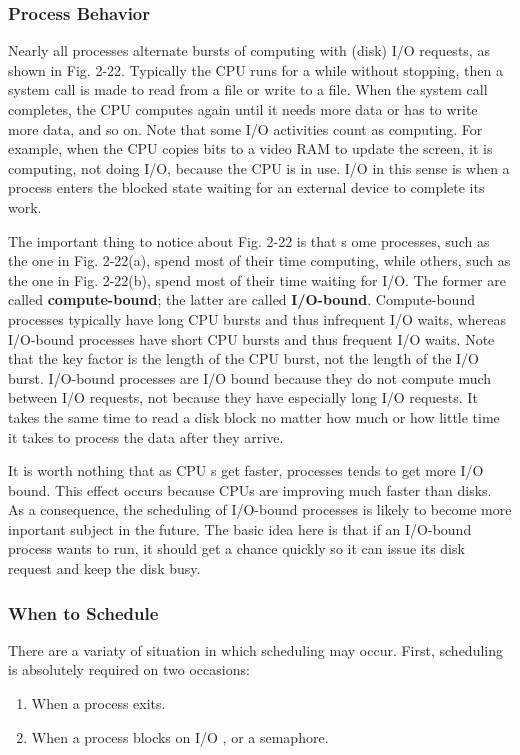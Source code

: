 \documentclass{book}
\newcommand {\kw}  [1] {\textbf{#1}}
\begin{document}
\subsubsection*{Process Behavior}
Nearly all processes alternate bursts of computing with (disk) I/O requests, as shown in Fig. 2-22.
Typically the CPU runs for a while without stopping, then a system call is made to read from a file or write to a file.
When the system call completes, the CPU computes again until it needs more data or has to write more data, and so on.
Note that some I/O activities count as computing.
For example, when the CPU copies bits to a video RAM to update the screen, it is computing, not doing I/O, because the CPU is in use.
I/O in this sense is when a process enters the blocked state waiting for an external device to complete its work.

The important thing to notice about Fig. 2-22 is that s
ome processes, such as the one in Fig. 2-22(a), spend most of their time computing, 
while others, such as the one in Fig. 2-22(b), spend most of their time waiting for I/O.
The former are called \kw{compute-bound}; the latter are called \kw{I/O-bound}.
Compute-bound processes typically have long CPU bursts and thus infrequent I/O waits,
whereas I/O-bound processes have short CPU bursts and thus frequent I/O waits.
Note that the key factor is the length of the CPU burst, not the length of the I/O burst.
I/O-bound processes are I/O bound because they do not compute much between I/O requests, 
not because they have especially long I/O requests.
It takes the same time to read a disk block no matter how much or how little time it takes to process the data after they arrive.

It is worth nothing that as CPU s get faster, processes tends to get more I/O bound.
This effect occurs because CPUs are improving much faster than disks.
As a consequence, the scheduling of I/O-bound processes is likely to become more inportant subject in the future.
The basic idea here is that if an I/O-bound process wants to run, 
it should get a chance quickly so it can issue its disk request and keep the disk busy.

\subsubsection*{When to Schedule}
There are a variaty of situation in which scheduling may occur.
First, scheduling is absolutely required on two occasions:
\begin{enumerate}
  \item When a process exits.
  \item When a process blocks on I/O , or a semaphore.
\end{enumerate}
 
\end{document}
